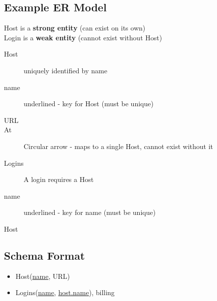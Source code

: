 \documentclass{article}
\begin{document}
\subsection{Example ER Model}

\begin{figure}[H]
\end{figure}

Host is a \textbf{strong entity} (can exist on its own)\\
Login is a \textbf{weak entity} (cannot exist without Host)\\
\begin{description}
  \item[Host] uniquely identified by name
  \item[name] underlined - key for Host (must be unique)
  \item[URL]
  \item[At] Circular arrow - maps to a single Host, cannot exist without it
  \item[Logins] A login requires a Host
  \item[name] underlined - key for name (must be unique)
  \item[Host]
\end{description}

\subsection{Schema Format}
\begin{itemize}
  \item{Host(\underline{name}, URL)}
  \item{Logins(\underline{name}, \underline{host.name}), billing}
\end{itemize}
\end{document}
